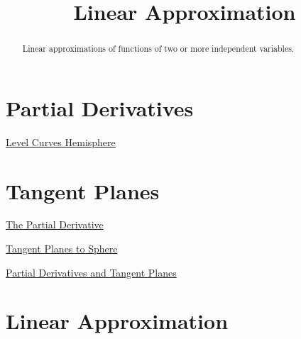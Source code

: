 \documentclass{ximera}
\title{Linear Approximation}
\begin{document}
\begin{abstract}
Linear approximations of functions of two or more independent variables.
\end{abstract}
\maketitle


\section{Partial Derivatives}

\begin{example}  \label{Edgtr543}

 
\begin{onlineOnly}
    \begin{center}
\end{center}
\end{onlineOnly}


\href{https://www.desmos.com/calculator/bphah69tkz}{Level Curves Hemisphere}


\end{example}



\section{Tangent Planes}
\begin{exploration}  \label{Edf754665}

 
\begin{onlineOnly}
    \begin{center}
\end{center}
\end{onlineOnly}


\href{https://www.desmos.com/calculator/y0h5kuvmbt}{The Partial Derivative}

\end{exploration}



\begin{exploration}  \label{Edf5khj4665}

\href{https://www.desmos.com/3d/d78d5a3138}{Tangent Planes to Sphere}

\end{exploration}

\begin{exploration}  \label{Ede5fhj4665}
\href{https://www.geogebra.org/m/Hud6Hnpk}{Partial Derivatives and Tangent Planes}
\end{exploration}


\section{Linear Approximation}
\end{document}
